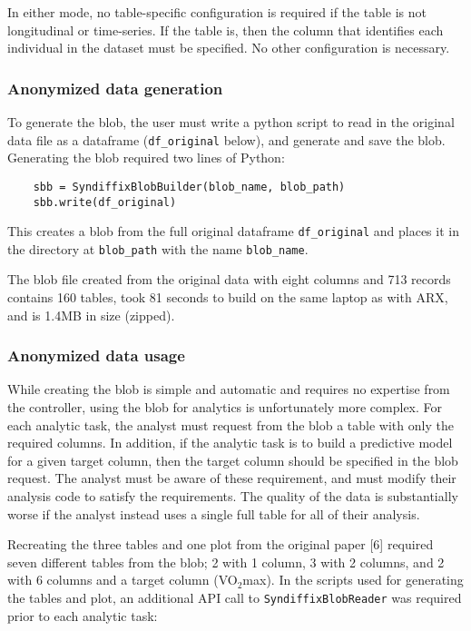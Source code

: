 \documentclass[10pt]{article}
\newcommand{\mycite}[1]{[#1]}
\begin{document}
In either mode, no table-specific configuration is required if the table is not longitudinal or time-series. If the table is, then the column that identifies each individual in the dataset must be specified. No other configuration is necessary.

\subsubsection*{Anonymized data generation}

To generate the blob, the user must write a python script to read in the original data file as a dataframe (\texttt{df\_original} below), and generate and save the blob. Generating the blob required two lines of Python:

{\small
\begin{verbatim}
    sbb = SyndiffixBlobBuilder(blob_name, blob_path)
    sbb.write(df_original)
\end{verbatim}
}

This creates a blob from the full original dataframe \texttt{df\_original} and places it in the directory at \texttt{blob\_path} with the name \texttt{blob\_name}.
 
The blob file created from the original data with eight columns and 713 records contains 160 tables, took 81 seconds to build on the same laptop as with ARX, and is 1.4MB in size (zipped).

\subsubsection*{Anonymized data usage}

While creating the blob is simple and automatic and requires no expertise from the controller, using the blob for analytics is unfortunately more complex. For each analytic task, the analyst must request from the blob a table with only the required columns. In addition, if the analytic task is to build a predictive model for a given target column, then the target column should be specified in the blob request. The analyst must be aware of these requirement, and must modify their analysis code to satisfy the requirements. The quality of the data is substantially worse if the analyst instead uses a single full table for all of their analysis.

Recreating the three tables and one plot from the original paper \mycite{6} required seven different tables from the blob; 2 with 1 column, 3 with 2 columns, and 2 with 6 columns and a target column (VO$_2$max). In the scripts used for generating the tables and plot, an additional API call to \texttt{SyndiffixBlobReader} was required prior to each analytic task:
\end{document}
